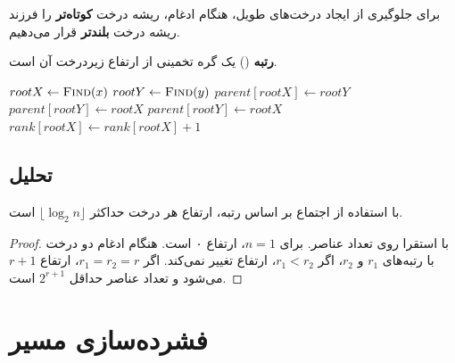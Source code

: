 \documentclass{matinbook}
\begin{document}
    برای جلوگیری از ایجاد درخت‌های طویل،
    هنگام ادغام، ریشه درخت \textbf{کوتاه‌تر} را
    فرزند ریشه درخت \textbf{بلندتر} قرار می‌دهیم.
    
    \begin{definition}[رتبه]
        \textbf{رتبه} () یک گره
        تخمینی از ارتفاع زیردرخت آن است.
        \label{def:rank}
    \end{definition}
    
    \begin{latin}
        \begin{algorithm}
            \begin{algorithmic}[1]
                \State $rootX \gets \Call{Find}{x}$
                \State $rootY \gets \Call{Find}{y}$
                \State \Return
                \EndIf
                \State $parent[rootX] \gets rootY$
                \State $parent[rootY] \gets rootX$
                \Else
                \State $parent[rootY] \gets rootX$
                \State $rank[rootX] \gets rank[rootX] + 1$
                \EndIf
                \EndFunction
            \end{algorithmic}
        \end{algorithm}
    \end{latin}
    
    \subsection{تحلیل}
    
    \begin{theorem}
        با استفاده از اجتماع بر اساس رتبه،
        ارتفاع هر درخت حداکثر $\lfloor \log_{2} n \rfloor$ است.
        \label{thm:union-rank-height}
    \end{theorem}
    
    \begin{proof}
        با استقرا روی تعداد عناصر.
        برای $n = 1$، ارتفاع ۰ است.
        هنگام ادغام دو درخت با رتبه‌های $r_{1}$ و $r_{2}$،
        اگر $r_{1} < r_{2}$، ارتفاع تغییر نمی‌کند.
        اگر $r_{1} = r_{2} = r$، ارتفاع $r+1$ می‌شود
        و تعداد عناصر حداقل $2^{r+1}$ است.
    \end{proof}
    
    \section{فشرده‌سازی مسیر}
    
\end{document}
